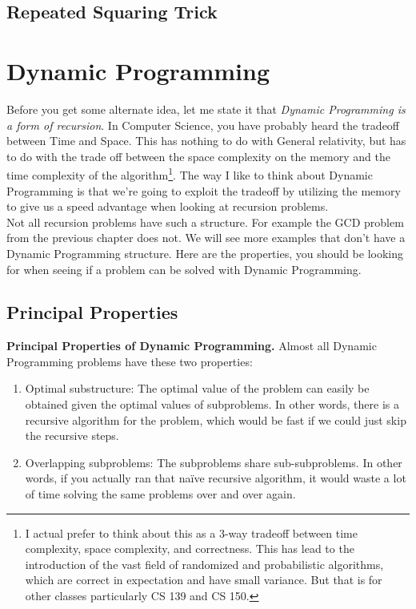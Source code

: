 \documentclass[11pt]{article}
\theoremstyle{plain}
\theoremstyle{definition}
\numberwithin{equation}{section}
\numberwithin{figure}{section}
\begin{document}
\subsection{Repeated Squaring Trick}

\newpage
\section{Dynamic Programming}

Before you get some alternate idea, let me state it that \emph{Dynamic Programming is a form of recursion}. In Computer Science, you have probably heard the tradeoff between Time and Space. This has nothing to do with General relativity, but has to do with the trade off between the space complexity on the memory and the time complexity of the algorithm\footnote{I actual prefer to think about this as a 3-way tradeoff between time complexity, space complexity, and correctness. This has lead to the introduction of the vast field of randomized and probabilistic algorithms, which are correct in expectation and have small variance. But that is for other classes particularly CS 139 and CS 150.}. The way I like to think about Dynamic Programming is that we're going to exploit the tradeoff by utilizing the memory to give us a speed advantage when looking at recursion problems. \\

\noindent Not all recursion problems have such a structure. For example the GCD problem from the previous chapter does not. We will see more examples that don't have a Dynamic Programming structure. Here are the properties, you should be looking for when seeing if a problem can be solved with Dynamic Programming.

\subsection{Principal Properties}

\begin{framed}
\noindent \textbf{Principal Properties of Dynamic Programming.} Almost all Dynamic Programming problems have these two properties:
\begin{enumerate}
\item Optimal substructure: The optimal value of the problem can easily be obtained given the optimal values of subproblems. In other words, there is a recursive algorithm for the problem, which would be fast if we could just skip the recursive steps.
\item Overlapping subproblems: The subproblems share sub-subproblems. In other words, if you actually ran that na{\"i}ve recursive algorithm, it would waste a lot of time solving the same problems over and over again.
\end{enumerate}
\end{framed}
\end{document}
